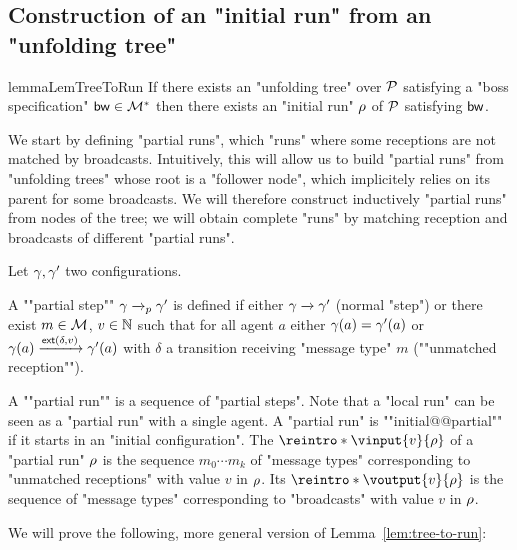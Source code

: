 \subsection{Construction of an "initial run" from an "unfolding tree"}
\label{app:tree-to-run}

\begin{restatable}{lemma}{LemTreeToRun}
	\label{lem:tree-to-run}
	If there exists an "unfolding tree" over $\mathcal{P}$ satisfying a "boss specification" $\mathsf{bw} \in \mathcal{M}^*$ then there exists an "initial run" $\rho$ of $\mathcal{P}$ satisfying $\mathsf{bw}$.
\end{restatable}

We start by defining "partial runs", which "runs" where some receptions are not matched by broadcasts. Intuitively, this will allow us to build "partial runs" from "unfolding trees" whose root is a "follower node", which implicitely relies on its parent for some broadcasts. We will therefore construct inductively "partial runs" from nodes of the tree; we will obtain complete "runs" by matching reception and broadcasts of different "partial runs".

\begin{definition}
	Let $\gamma, \gamma'$ two configurations. 
	
	A ""partial step"" $\gamma \xrightarrow{}_{p} \gamma'$ is defined if either $\gamma \xrightarrow{} \gamma'$ (normal "step") or there exist $m \in \mathcal{M}$, $v\in \mathbb{N}$ such that for all agent $a$ either $\gamma(a) = \gamma'(a)$ or $\gamma(a) \xrightarrow{\mathsf{ext}(\delta,v)} \gamma'(a)$ with $\delta$ a transition receiving "message type" $m$ (""unmatched reception"").
	
	\AP A ""partial run"" is a sequence of "partial steps".
	Note that a "local run" can be seen as a "partial run" with a single agent. A "partial run" is ""initial@@partial"" if it starts in an "initial configuration".
	The  $\reintro*\vinput{v}{\run}$ of a "partial run" $\rho$ is the sequence $m_0 \cdots m_k$ of "message types" corresponding to "unmatched receptions" with value $v$ in $\rho$. Its  $\reintro*\voutput{v}{\run}$ is the sequence of "message types" corresponding to "broadcasts" with value $v$ in $\rho$.
\end{definition}


We will prove the following, more general version of Lemma~\ref{lem:tree-to-run}:

